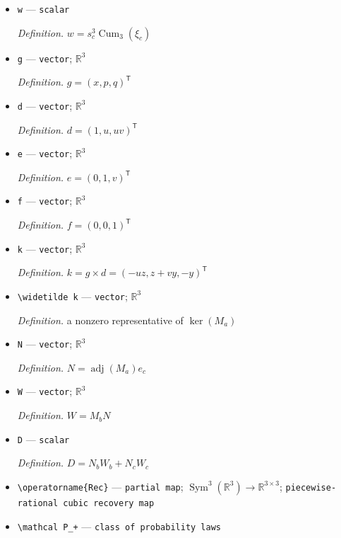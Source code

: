 \documentclass{article}
\begin{document}
\begin{itemize}
  \par\smallskip\noindent\emph{Definition.} \(t=s_b^3\operatorname{Cum}_3(\xi_b)\)
  \item \texttt{w} --- \texttt{scalar}
  \par\smallskip\noindent\emph{Definition.} \(w=s_c^3\operatorname{Cum}_3(\xi_c)\)
  \item \texttt{g} --- \texttt{vector}; \(\mathbb R^3\)
  \par\smallskip\noindent\emph{Definition.} \(g=(x,p,q)^{\mathsf T}\)
  \item \texttt{d} --- \texttt{vector}; \(\mathbb R^3\)
  \par\smallskip\noindent\emph{Definition.} \(d=(1,u,uv)^{\mathsf T}\)
  \item \texttt{e} --- \texttt{vector}; \(\mathbb R^3\)
  \par\smallskip\noindent\emph{Definition.} \(e=(0,1,v)^{\mathsf T}\)
  \item \texttt{f} --- \texttt{vector}; \(\mathbb R^3\)
  \par\smallskip\noindent\emph{Definition.} \(f=(0,0,1)^{\mathsf T}\)
  \item \texttt{k} --- \texttt{vector}; \(\mathbb R^3\)
  \par\smallskip\noindent\emph{Definition.} \(k=g\times d=(-uz,z+vy,-y)^{\mathsf T}\)
  \item \texttt{\textbackslash{}\allowbreak{}widetilde k} --- \texttt{vector}; \(\mathbb R^3\)
  \par\smallskip\noindent\emph{Definition.} a nonzero representative of \(\ker(M_a)\)
  \item \texttt{N} --- \texttt{vector}; \(\mathbb R^3\)
  \par\smallskip\noindent\emph{Definition.} \(N=\operatorname{adj}(M_a)e_c\)
  \item \texttt{W} --- \texttt{vector}; \(\mathbb R^3\)
  \par\smallskip\noindent\emph{Definition.} \(W=M_bN\)
  \item \texttt{D} --- \texttt{scalar}
  \par\smallskip\noindent\emph{Definition.} \(D=N_bW_b+N_cW_c\)
  \item \texttt{\textbackslash{}\allowbreak{}operatorname\{Rec\}\allowbreak{}} --- \texttt{partial map}; \(\operatorname{Sym}^3(\mathbb R^3)\to\mathbb R^{3\times3}\); \texttt{piecewise-\allowbreak{}rational cubic recovery map}
  \item \texttt{\textbackslash{}\allowbreak{}mathcal P\_\allowbreak{}+\allowbreak{}} --- \texttt{class of probability laws}

\end{itemize}
\end{document}
